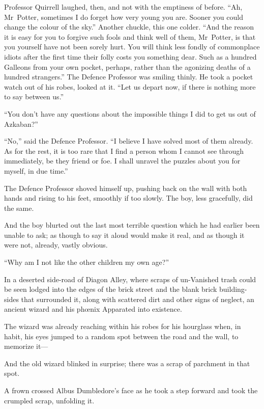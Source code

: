 Professor Quirrell laughed, then, and not with the emptiness of before. “Ah, Mr~Potter, sometimes I do forget how very young you are. Sooner you could change the colour of the sky.” Another chuckle, this one colder. “And the reason it is easy for you to forgive such fools and think well of them, Mr~Potter, is that you yourself have not been sorely hurt. You will think less fondly of commonplace idiots after the first time their folly costs you something dear. Such as a hundred Galleons from your own pocket, perhaps, rather than the agonizing deaths of a hundred strangers.” The Defence Professor was smiling thinly. He took a pocket watch out of his robes, looked at it. “Let us depart now, if there is nothing more to say between us.”

“You don’t have any questions about the impossible things I did to get us out of Azkaban?”

“No,” said the Defence Professor. “I believe I have solved most of them already. As for the rest, it is too rare that I find a person whom I cannot see through immediately, be they friend or foe. I shall unravel the puzzles about you for myself, in due time.”

The Defence Professor shoved himself up, pushing back on the wall with both hands and rising to his feet, smoothly if too slowly. The boy, less gracefully, did the same.

And the boy blurted out the last most terrible question which he had earlier been unable to ask; as though to say it aloud would make it real, and as though it were not, already, vastly obvious.

“Why am I not like the other children my own age?”

\later

In a deserted side-road of Diagon Alley, where scraps of un-Vanished trash could be seen lodged into the edges of the brick street and the blank brick building-sides that surrounded it, along with scattered dirt and other signs of neglect, an ancient wizard and his phœnix Apparated into existence.

The wizard was already reaching within his robes for his hourglass when, in habit, his eyes jumped to a random spot between the road and the wall, to memorize it—

And the old wizard blinked in surprise; there was a scrap of parchment in that spot.

A frown crossed Albus Dumbledore’s face as he took a step forward and took the crumpled scrap, unfolding it.

